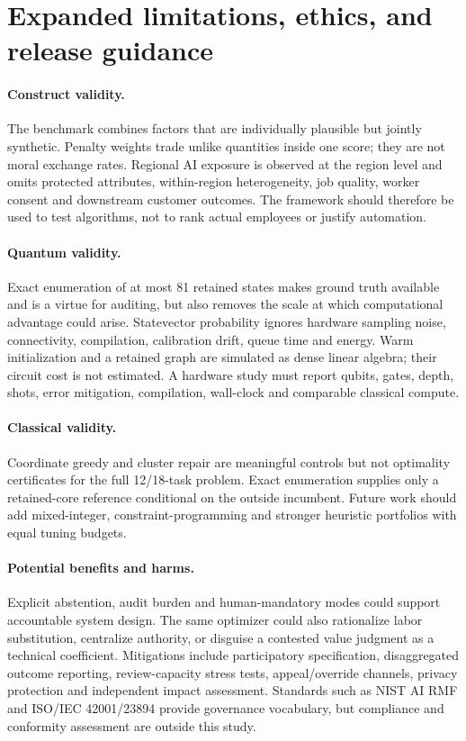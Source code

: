 \section{Expanded limitations, ethics, and release guidance}
\label{app:ethics}

\paragraph{Construct validity.}
The benchmark combines factors that are individually plausible but jointly synthetic. Penalty weights trade unlike quantities inside one score; they are not moral exchange rates. Regional AI exposure is observed at the region level and omits protected attributes, within-region heterogeneity, job quality, worker consent and downstream customer outcomes. The framework should therefore be used to test algorithms, not to rank actual employees or justify automation.

\paragraph{Quantum validity.}
Exact enumeration of at most 81 retained states makes ground truth available and is a virtue for auditing, but also removes the scale at which computational advantage could arise. Statevector probability ignores hardware sampling noise, connectivity, compilation, calibration drift, queue time and energy. Warm initialization and a retained graph are simulated as dense linear algebra; their circuit cost is not estimated. A hardware study must report qubits, gates, depth, shots, error mitigation, compilation, wall-clock and comparable classical compute.

\paragraph{Classical validity.}
Coordinate greedy and cluster repair are meaningful controls but not optimality certificates for the full 12/18-task problem. Exact enumeration supplies only a retained-core reference conditional on the outside incumbent. Future work should add mixed-integer, constraint-programming and stronger heuristic portfolios with equal tuning budgets.

\paragraph{Potential benefits and harms.}
Explicit abstention, audit burden and human-mandatory modes could support accountable system design. The same optimizer could also rationalize labor substitution, centralize authority, or disguise a contested value judgment as a technical coefficient. Mitigations include participatory specification, disaggregated outcome reporting, review-capacity stress tests, appeal/override channels, privacy protection and independent impact assessment. Standards such as NIST AI RMF and ISO/IEC 42001/23894 provide governance vocabulary, but compliance and conformity assessment are outside this study.


